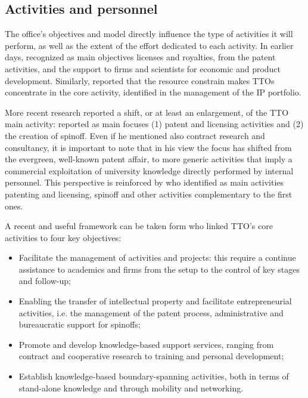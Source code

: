 \subsection{Activities and personnel}

The office's objectives and model directly influence the type of activities it will perform, as well as the extent of the effort dedicated to each activity. In earlier days,\citet{Siegel2003a} recognized as main objectives licenses and royalties, from the patent activities, and the support to firms and scientists for economic and product development. Similarly, \citet{OwenSmith2001} reported that the resource constrain makes TTOs concentrate in the core activity, identified in the management of the IP portfolio.

More recent research reported a shift, or at least an enlargement, of the TTO main activity: \citet{Geuna2009} reported as main focuses (1) patent and licensing activities and (2) the creation of spinoff. Even if he mentioned also contract research and consultancy, it is important to note that in his view the focus has shifted from the evergreen, well-known patent affair, to more generic activities that imply a commercial exploitation of university knowledge directly performed by internal personnel. This perspective is reinforced by \citet{Balderi2010} who identified as main activities patenting and licensing, spinoff and other activities complementary to the first ones.

A recent and useful framework can be taken form \citet{Alexander2013}who linked TTO's core activities to four key objectives: 
\begin{itemize}
\item Facilitate the management of activities and projects: this require a continue assistance to academics and firms from the setup to the control of key stages and follow-up;
\item Enabling the transfer of intellectual property and facilitate entrepreneurial activities, i.e. the management of the patent process, administrative and bureaucratic support for spinoffs;
\item Promote and develop knowledge-based support services, ranging from contract and cooperative research to training and personal development;
\item Establish knowledge-based boundary-spanning activities, both in terms of stand-alone knowledge and through mobility and networking. 
\end{itemize}


